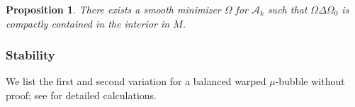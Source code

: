 \documentclass[11pt,letterpaper]{amsart}
\DeclareMathOperator{\divsymb}{div}
\newcommand{\mA}{\mathcal{A}}
\newcommand{\mC}{\mathcal{C}}
\newcommand{\mH}{\mathcal{H}}
\newtheorem{proposition}[theorem]{Proposition}
\theoremstyle{definition}
\theoremstyle{remark}
\numberwithin{equation}{section}
\begin{document}

\begin{proposition}
There exists a smooth minimizer $\Omega$ for $\mA_{k}$ such that $\Omega\Delta\Omega_0$ is compactly contained in the interior in $M$.
\end{proposition}
    


\subsubsection{Stability}
We list the first and second variation for a balanced warped $\mu$-bubble without proof; see \cite{chodosh-li-bubble} for detailed calculations.
\end{document}
